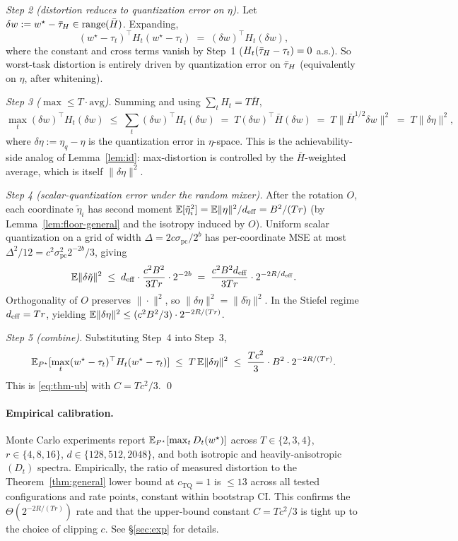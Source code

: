 \emph{Step 2 (distortion reduces to quantization error on
$\eta$).} Let $\delta w := w^\star - \bar{\tau}_H\in\operatorname{range}(\bar H)$.
Expanding,
\begin{equation*}
  (w^\star-\tau_t)^\top H_t(w^\star-\tau_t)
  \;=\; (\delta w)^\top H_t(\delta w),
\end{equation*}
where the constant and cross terms vanish by Step~1
($H_t(\bar{\tau}_H-\tau_t) = 0$ a.s.). So worst-task distortion is
entirely driven by quantization error on $\bar{\tau}_H$ (equivalently on
$\eta$, after whitening).

\emph{Step 3 ($\max\leq T\cdot\mathrm{avg}$).} Summing and using
$\sum_t H_t = T\bar H$,
\begin{equation*}
  \max_t (\delta w)^\top H_t(\delta w) \;\leq\;
  \sum_t (\delta w)^\top H_t(\delta w) \;=\;
  T(\delta w)^\top\bar H(\delta w)
  \;=\; T\|\bar H^{1/2}\delta w\|^2 \;=\; T\|\delta\eta\|^2,
\end{equation*}
where $\delta\eta := \eta_q - \eta$ is the quantization error in
$\eta$-space. This is the achievability-side analog of
Lemma~\ref{lem:id}: max-distortion is controlled by the
$\bar H$-weighted average, which is itself $\|\delta\eta\|^2$.

\emph{Step 4 (scalar-quantization error under the random
mixer).} After the rotation $O$, each coordinate $\tilde\eta_i$
has second moment $\mathbb{E}[\tilde\eta_i^2] = \mathbb{E}\|\eta\|^2/d_{\mathrm{eff}} =
B^2/(Tr)$ (by Lemma~\ref{lem:floor-general} and the isotropy
induced by $O$). Uniform scalar quantization on a grid of width
$\Delta = 2 c\sigma_{\mathrm{pc}}/2^b$ has per-coordinate MSE at
most $\Delta^2/12 = c^2\sigma_{\mathrm{pc}}^2 2^{-2b}/3$, giving
\begin{equation*}
  \mathbb{E}\|\delta\tilde\eta\|^2 \;\leq\;
  d_{\mathrm{eff}}\cdot\frac{c^2 B^2}{3Tr}\cdot 2^{-2b}
  \;=\; \frac{c^2 B^2d_{\mathrm{eff}}}{3Tr}\cdot 2^{-2R/d_{\mathrm{eff}}}.
\end{equation*}
Orthogonality of $O$ preserves $\|\cdot\|^2$, so
$\|\delta\eta\|^2 = \|\delta\tilde\eta\|^2$. In the Stiefel
regime $d_{\mathrm{eff}} = Tr$, yielding $\mathbb{E}\|\delta\eta\|^2 \leq
(c^2 B^2/3)\cdot 2^{-2R/(Tr)}$.

\emph{Step 5 (combine).} Substituting Step~4 into Step~3,
\begin{equation*}
  \mathbb{E}_{P^\star}[\max_t(w^\star-\tau_t)^\top H_t(w^\star-
  \tau_t)] \;\leq\; T\,\mathbb{E}\|\delta\eta\|^2 \;\leq\;
  \frac{Tc^2}{3}\cdot B^2 \cdot 2^{-2R/(Tr)}.
\end{equation*}
This is \eqref{eq:thm-ub} with $C = Tc^2/3$. \qed

\paragraph{Empirical calibration.} Monte Carlo experiments
report $\mathbb{E}_{P^\star}[\max_t D_t(w^\star)]$ across
$T\in\{2,3,4\}$, $r\in\{4,8,16\}$, $d\in\{128,512,2048\}$, and
both isotropic and heavily-anisotropic $(D_t)$ spectra.
Empirically, the ratio of measured distortion to the
Theorem~\ref{thm:general} lower bound at $c_{\mathrm{TQ}} = 1$
is $\leq 13$ across all tested configurations and rate points,
constant within bootstrap CI. This confirms the
$\Theta(2^{-2R/(Tr)})$ rate and that the upper-bound constant
$C = Tc^2/3$ is tight up to the choice of clipping $c$. See
\S\ref{sec:exp} for details.

